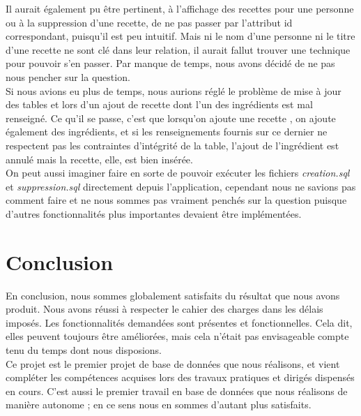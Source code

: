 \documentclass[a4paper,10pt]{report}
\begin{document}
Il aurait également pu être pertinent, à l'affichage des recettes pour une personne ou à la suppression d'une recette, de ne pas passer par l'attribut id  correspondant, puisqu'il est peu intuitif. Mais ni le nom d'une personne ni le titre d'une recette ne sont clé dans leur relation, il aurait fallut trouver une technique pour pouvoir s'en passer. Par manque de temps, nous avons décidé de ne pas nous	 pencher sur la question. \\

Si nous avions eu plus de temps, nous aurions réglé le problème de mise à jour des tables  et  lors d'un ajout de recette dont l'un des ingrédients est mal renseigné. Ce qu'il se passe, c'est que lorsqu'on ajoute une recette , on ajoute également des ingrédients, et si les renseignements fournis sur ce dernier ne respectent pas les contraintes d'intégrité de la table, l'ajout de l'ingrédient est annulé mais la recette, elle, est bien insérée.\\

On peut aussi imaginer faire en sorte de pouvoir exécuter les fichiers \textit{creation.sql} et \textit{suppression.sql} directement depuis l'application, cependant nous ne savions pas comment faire et ne nous sommes pas vraiment penchés sur la question puisque d'autres fonctionnalités plus importantes devaient être implémentées.

\chapter{Conclusion}

En conclusion, nous sommes globalement satisfaits du résultat que nous avons produit. Nous avons réussi à respecter le cahier des charges dans les délais imposés. Les fonctionnalités demandées sont présentes et fonctionnelles. Cela dit, elles peuvent toujours être améliorées, mais cela n'était pas envisageable compte tenu du temps dont nous disposions.\\

Ce projet est le premier projet de base de données que nous réalisons, et vient compléter les compétences acquises lors des travaux pratiques et dirigés dispensés en cours. C'est aussi le premier travail en base de données que nous réalisons de manière autonome ; en ce sens nous en sommes d'autant plus satisfaits. \\
\end{document}
